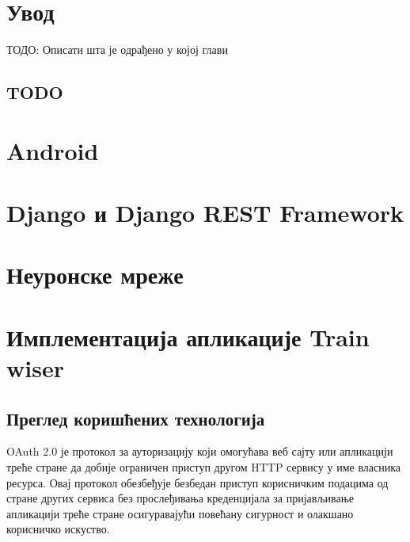 \documentclass[12pt,oneside]{memoir}
\begin{document}
\frontmatter
\naslovna
\komisija
\posveta{}
\apstrakt
\tableofcontents*

\mainmatter

\chapter{Увод}
ТОДО: Описати шта је одрађено у којој глави

\section{TODO}




\chapter{Android}


\chapter{Django и Django REST Framework}


\chapter{Неуронске мреже}


\chapter{Имплементација апликације Train wiser}
\section{Преглед коришћених технологија}
OAuth 2.0 је протокол за ауторизацију који омогућава веб сајту или апликацији треће стране да добије ограничен приступ другом HTTP сервису у име власника ресурса. Овај протокол обезбеђује безбедан приступ корисничким подацима од стране других сервиса без прослеђивања креденцијала за пријављивање апликацији треће стране осигуравајући повећану сигурност и олакшано корисничко искуство.
\end{document}
